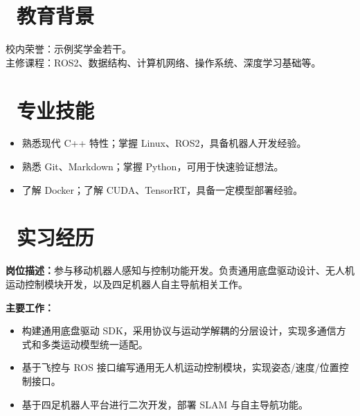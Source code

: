 \documentclass{resume}
\begin{document}


\section{\texorpdfstring{\faGraduationCap\ 教育背景}{教育背景}}
校内荣誉：示例奖学金若干。\\
主修课程：ROS2、数据结构、计算机网络、操作系统、深度学习基础等。

\section{\texorpdfstring{\faCogs\ 专业技能}{专业技能}}
\begin{itemize}
  \item 熟悉现代 C++ 特性；掌握 Linux、ROS2，具备机器人开发经验。
  \item 熟悉 Git、Markdown；掌握 Python，可用于快速验证想法。
  \item 了解 Docker；了解 CUDA、TensorRT，具备一定模型部署经验。
\end{itemize}

\section{\texorpdfstring{\faBuildingO\ 实习经历}{实习经历}}
\textbf{岗位描述：}参与移动机器人感知与控制功能开发。负责通用底盘驱动设计、无人机运动控制模块开发，以及四足机器人自主导航相关工作。

\textbf{主要工作：}
\begin{itemize}
  \item 构建通用底盘驱动 SDK，采用协议与运动学解耦的分层设计，实现多通信方式和多类运动模型统一适配。
  \item 基于飞控与 ROS 接口编写通用无人机运动控制模块，实现姿态/速度/位置控制接口。
  \item 基于四足机器人平台进行二次开发，部署 SLAM 与自主导航功能。
\end{itemize}
\end{document}
